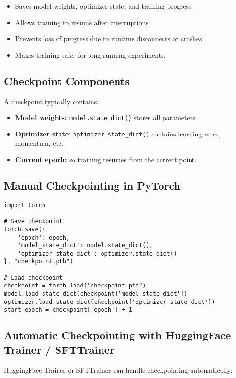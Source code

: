 \begin{tcolorbox}[colback=blue!5!white, colframe=blue!75!black, title=Why Checkpointing is Important]
\begin{itemize}
    \item Saves model weights, optimizer state, and training progress.
    \item Allows training to resume after interruptions.
    \item Prevents loss of progress due to runtime disconnects or crashes.
    \item Makes training safer for long-running experiments.
\end{itemize}
\end{tcolorbox}

\subsection{Checkpoint Components}
A checkpoint typically contains:
\begin{itemize}
    \item \textbf{Model weights:} \texttt{model.state\_dict()} stores all parameters.
    \item \textbf{Optimizer state:} \texttt{optimizer.state\_dict()} contains learning rates, momentum, etc.
    \item \textbf{Current epoch:} so training resumes from the correct point.
\end{itemize}

\subsection{Manual Checkpointing in PyTorch}
\begin{tcolorbox}[colback=yellow!5!white, colframe=yellow!75!black, title=PyTorch Example]
\begin{verbatim}
import torch

# Save checkpoint
torch.save({
    'epoch': epoch,
    'model_state_dict': model.state_dict(),
    'optimizer_state_dict': optimizer.state_dict()
}, "checkpoint.pth")

# Load checkpoint
checkpoint = torch.load("checkpoint.pth")
model.load_state_dict(checkpoint['model_state_dict'])
optimizer.load_state_dict(checkpoint['optimizer_state_dict'])
start_epoch = checkpoint['epoch'] + 1
\end{verbatim}
\end{tcolorbox}

\subsection{Automatic Checkpointing with HuggingFace Trainer / SFTTrainer}
HuggingFace Trainer or SFTTrainer can handle checkpointing automatically:

